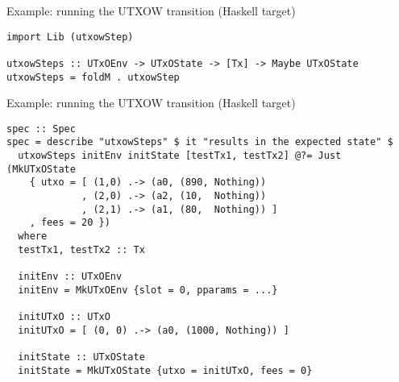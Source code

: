 \documentclass[aspectratio=169]{beamer}
\renewcommand\alert[1]{\textcolor{mLightBrown}{#1}}
\begin{document}
\begin{frame}[fragile]{Example: \alert{running} the UTXOW transition (\alert{Haskell} target)}
\begin{verbatim}
import Lib (utxowStep)

utxowSteps :: UTxOEnv -> UTxOState -> [Tx] -> Maybe UTxOState
utxowSteps = foldM . utxowStep
\end{verbatim}
\end{frame}
\begin{frame}[fragile]{Example: \alert{running} the UTXOW transition (\alert{Haskell} target)}
\begin{verbatim}
spec :: Spec
spec = describe "utxowSteps" $ it "results in the expected state" $
  utxowSteps initEnv initState [testTx1, testTx2] @?= Just (MkUTxOState
    { utxo = [ (1,0) .-> (a0, (890, Nothing))
             , (2,0) .-> (a2, (10,  Nothing))
             , (2,1) .-> (a1, (80,  Nothing)) ]
    , fees = 20 })
  where
  testTx1, testTx2 :: Tx

  initEnv :: UTxOEnv
  initEnv = MkUTxOEnv {slot = 0, pparams = ...}

  initUTxO :: UTxO
  initUTxO = [ (0, 0) .-> (a0, (1000, Nothing)) ]

  initState :: UTxOState
  initState = MkUTxOState {utxo = initUTxO, fees = 0}
\end{verbatim}
\end{frame}
\end{document}

